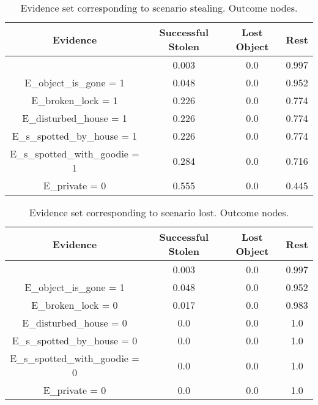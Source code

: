 \begin{table}\begin{tabular}{c|c|c|c}Evidence & Successful Stolen & Lost Object & Rest \\\hline & 0.003 & 0.0 & 0.997 \\E\_object\_is\_gone = 1 & 0.048 & 0.0 & 0.952 \\E\_broken\_lock = 1 & 0.226 & 0.0 & 0.774 \\E\_disturbed\_house = 1 & 0.226 & 0.0 & 0.774 \\E\_s\_spotted\_by\_house = 1 & 0.226 & 0.0 & 0.774 \\E\_s\_spotted\_with\_goodie = 1 & 0.284 & 0.0 & 0.716 \\E\_private = 0 & 0.555 & 0.0 & 0.445 \\\end{tabular}\caption{Evidence set corresponding to scenario stealing. Outcome nodes.}\end{table}
\begin{table}\begin{tabular}{c|c|c|c}Evidence & Successful Stolen & Lost Object & Rest \\\hline & 0.003 & 0.0 & 0.997 \\E\_object\_is\_gone = 1 & 0.048 & 0.0 & 0.952 \\E\_broken\_lock = 0 & 0.017 & 0.0 & 0.983 \\E\_disturbed\_house = 0 & 0.0 & 0.0 & 1.0 \\E\_s\_spotted\_by\_house = 0 & 0.0 & 0.0 & 1.0 \\E\_s\_spotted\_with\_goodie = 0 & 0.0 & 0.0 & 1.0 \\E\_private = 0 & 0.0 & 0.0 & 1.0 \\\end{tabular}\caption{Evidence set corresponding to scenario lost. Outcome nodes.}\end{table}
